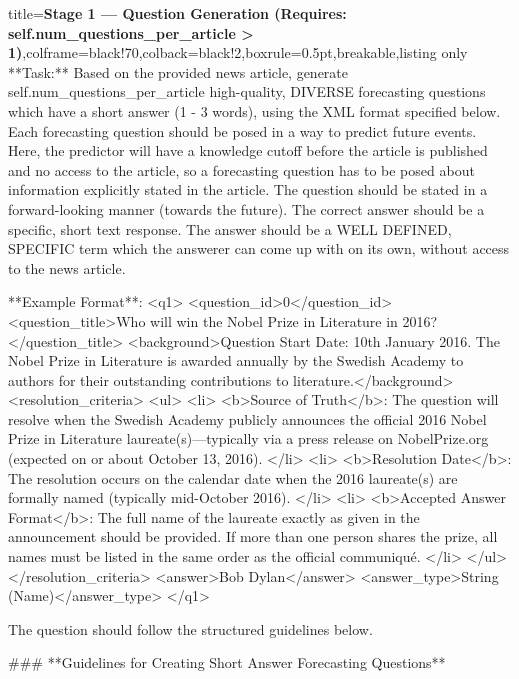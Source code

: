 \documentclass{article} %
\begin{document}
\begin{tcblisting}{title={\textbf{Stage 1 --- Question Generation (Requires:  self.num\_questions\_per\_article > 1)}},colframe=black!70,colback=black!2,boxrule=0.5pt,breakable,listing only}
**Task:** Based on the provided news article, generate {self.num_questions_per_article} high-quality, DIVERSE forecasting questions which have a short answer (1 - 3 words), using the XML format specified below.
Each forecasting question should be posed in a way to predict future events. Here, the predictor will have a knowledge cutoff before the article is published and no access to the article, so a forecasting question has to be posed about information explicitly stated in the article. The question should be stated in a forward-looking manner (towards the future).
The correct answer should be a specific, short text response. The answer should be a WELL DEFINED, SPECIFIC term which the answerer can come up with on its own, without access to the news article. 

**Example Format**:
<q1>
<question_id>0</question_id>
<question_title>Who will win the Nobel Prize in Literature in 2016?</question_title>
<background>Question Start Date: 10th January 2016. The Nobel Prize in Literature is awarded annually by the Swedish Academy to authors for their outstanding contributions to literature.</background>
<resolution_criteria> 
<ul>
    <li>
      <b>Source of Truth</b>: The question will resolve when the Swedish Academy publicly announces the official 2016 Nobel Prize in Literature laureate(s)---typically via a press release on NobelPrize.org (expected on or about October 13, 2016).  
    </li>
    <li>
      <b>Resolution Date</b>: The resolution occurs on the calendar date when the 2016 laureate(s) are formally named
      (typically mid-October 2016). 
    </li>
    <li>
      <b>Accepted Answer Format</b>: The full name of the laureate exactly as given in the announcement should be provided. If more than one person shares the prize, all names must be listed in the same order as the official communiqu{\'e}.
    </li>
</ul>
</resolution_criteria>
<answer>Bob Dylan</answer>
<answer_type>String (Name)</answer_type>
</q1>

The question should follow the structured guidelines below.

### **Guidelines for Creating Short Answer Forecasting Questions**


\end{tcblisting}
\end{document}
